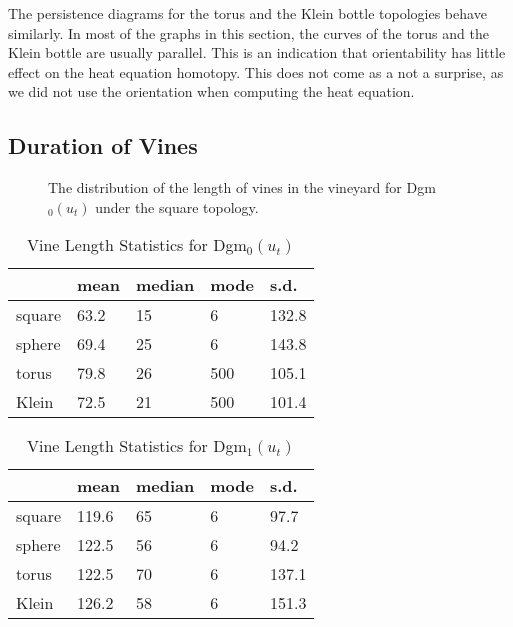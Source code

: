 The persistence diagrams for the torus and the Klein
bottle topologies behave similarly.  In most of the graphs in this section, the
curves of the torus and the Klein bottle are usually parallel.  This is an 
indication that orientability has little effect on the heat equation homotopy.  
This does not come as a not a surprise, as we did not
use the orientation when computing the heat equation.

\subsection{Duration of Vines}
\begin{figure}[hbt]
 \vspace*{0.1in}
 \centering
 \centerline{}
 \caption{The distribution of the length of vines in the vineyard for Dgm$_0(u_t)$
          under the square topology.}
 \label{fig:vine_lengths}
\end{figure}
\begin{table}[h!b!p!]
\caption{Vine Length Statistics for Dgm$_0(u_t)$}
\begin{center} \begin{tabular}{ |l | l | l | l | l | }
    \hline
          & mean & median & mode  & s.d.   \\ \hline\hline
   square & 63.2 & 15     & 6     & 132.8  \\ \hline
   sphere & 69.4 & 25     & 6     & 143.8  \\ \hline
   torus  & 79.8 & 26     & 500   & 105.1  \\ \hline
   Klein  & 72.5 & 21     & 500   & 101.4  \\ 
    \hline
  \end{tabular}
\end{center}\label{table:dgm0}
\end{table}
\begin{table}[h!b!p!]
\caption{Vine Length Statistics for Dgm$_1(u_t)$}
\begin{center} \begin{tabular}{ |l | l | l | l | l | }
    \hline
          & mean  & median & mode & s.d.  \\ \hline\hline
   square & 119.6 & 65     & 6    & 97.7  \\ \hline
   sphere & 122.5 & 56     & 6    & 94.2  \\ \hline
   torus  & 122.5 & 70     & 6    & 137.1 \\ \hline
   Klein  & 126.2 & 58     & 6    & 151.3 \\ 
    \hline
  \end{tabular}
\end{center}\label{table:dgm1}
\end{table}
